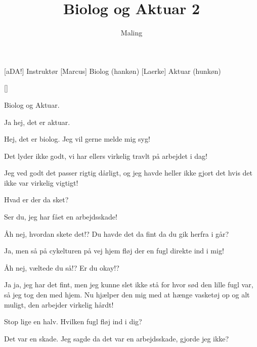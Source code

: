 \documentclass[a4paper,11pt]{article}
\title{Biolog og Aktuar 2}
\author{Maling}
\begin{document}
\maketitle

\begin{roles}
[aDA!] Instruktør
[Marcus] Biolog (hankøn)
[Laerke] Aktuar (hunkøn)
\end{roles}

\begin{props}
[]
\end{props}

\begin{sketch}
 Biolog og Aktuar.


 Ja hej, det er aktuar.

 Hej, det er biolog. Jeg vil gerne melde mig syg!

 Det lyder ikke godt, vi har ellers virkelig travlt på arbejdet i dag!

 Jeg ved godt det passer rigtig dårligt, og jeg havde heller ikke gjort det hvis det ikke var virkelig vigtigt!

 Hvad er der da sket?

 Ser du, jeg har fået en arbejdsskade!

 Åh nej, hvordan skete det!? Du havde det da fint da du gik herfra i går?

 Ja, men så på cykelturen på vej hjem fløj der en fugl direkte ind i mig!

 Åh nej, væltede du så!? Er du okay!?

 Ja ja, jeg har det fint, men jeg kunne slet ikke stå for hvor sød den lille fugl var, så jeg tog den med hjem. Nu hjælper den mig med at hænge vasketøj op og alt muligt, den arbejder virkelig hårdt!

 Stop lige en halv. Hvilken fugl fløj ind i dig?

 Det var en skade. Jeg sagde da det var en arbejdsskade, gjorde jeg ikke?

\end{sketch}
\end{document}
